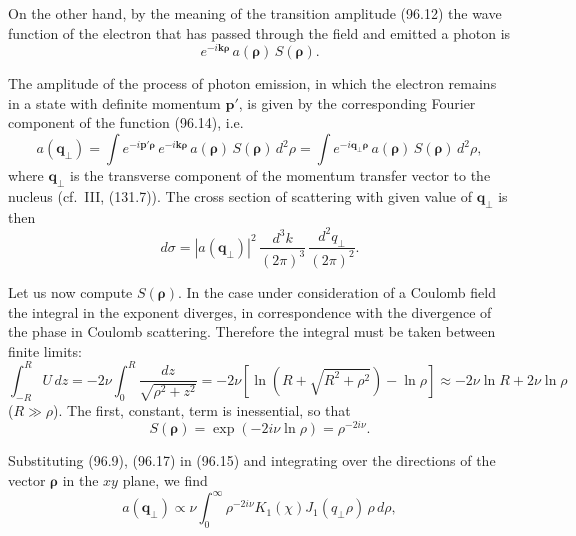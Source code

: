 On the other hand, by the meaning of the transition amplitude (96.12) the wave function of the electron that has passed through the field and emitted a photon is
\begin{equation}
e^{-i\mathbf{k}\boldsymbol{\rho}}\,a(\boldsymbol{\rho})\,S(\boldsymbol{\rho}).
\label{eq:96.14}
\end{equation}

The amplitude of the process of photon emission, in which the electron remains in a state with definite momentum $\mathbf{p}'$, is given by the corresponding Fourier component of the function (96.14), i.e.
\begin{equation}
a(\mathbf{q}_\perp) = \int e^{-i\mathbf{p}'\boldsymbol{\rho}}\,e^{-i\mathbf{k}\boldsymbol{\rho}}\,a(\boldsymbol{\rho})\,S(\boldsymbol{\rho})\,d^2\rho = \int e^{-i\mathbf{q}_\perp\boldsymbol{\rho}}\,a(\boldsymbol{\rho})\,S(\boldsymbol{\rho})\,d^2\rho,
\label{eq:96.15}
\end{equation}
where $\mathbf{q}_\perp$ is the transverse component of the momentum transfer vector to the nucleus (cf.\ III, (131.7)). The cross section of scattering with given value of $\mathbf{q}_\perp$ is then
\begin{equation}
d\sigma = |a(\mathbf{q}_\perp)|^2\,\frac{d^3k}{(2\pi)^3}\,\frac{d^2q_\perp}{(2\pi)^2}.
\label{eq:96.16}
\end{equation}

Let us now compute $S(\boldsymbol{\rho})$. In the case under consideration of a Coulomb field the integral in the exponent diverges, in correspondence with the divergence of the phase in Coulomb scattering. Therefore the integral must be taken between finite limits:
\[
\int_{-R}^{R}U\,dz = -2\nu\int_0^R\frac{dz}{\sqrt{\rho^2+z^2}} = -2\nu[\ln(R+\sqrt{R^2+\rho^2}) - \ln\rho] \approx -2\nu\ln R + 2\nu\ln\rho
\]
($R \gg \rho$). The first, constant, term is inessential, so that
\begin{equation}
S(\boldsymbol{\rho}) = \exp(-2i\nu\ln\rho) = \rho^{-2i\nu}.
\label{eq:96.17}
\end{equation}

Substituting (96.9), (96.17) in (96.15) and integrating over the directions of the vector $\boldsymbol{\rho}$ in the $xy$ plane, we find
\begin{equation}
a(\mathbf{q}_\perp) \propto \nu\int_0^{\infty}\rho^{-2i\nu}K_1(\chi)J_1(q_\perp\rho)\,\rho\,d\rho,
\label{eq:96.18}
\end{equation}


